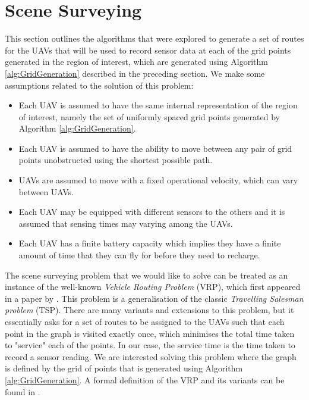 
\section{Scene Surveying}
This section outlines the algorithms that were explored to generate a set of routes for the UAVs that will be used to record sensor data at each of the grid points generated in the region of interest, which are generated using Algorithm \ref{alg:GridGeneration} described in the preceding section. We make some assumptions related to the solution of this problem:
\begin{itemize}
    \item Each UAV is assumed to have the same internal representation of the region of interest, namely the set of uniformly spaced grid points generated by Algorithm \ref{alg:GridGeneration}.
    \item Each UAV is assumed to have the ability to move between any pair of grid points unobstructed using the shortest possible path.
    \item UAVs are assumed to move with a fixed operational velocity, which can vary between UAVs.
    \item Each UAV may be equipped with different sensors to the others and it is assumed that sensing times may varying among the UAVs.
    \item Each UAV has a finite battery capacity which implies they have a finite amount of time that they can fly for before they need to recharge.
\end{itemize}


The scene surveying problem that we would like to solve can be treated as an instance of the well-known \textit{Vehicle Routing Problem} (VRP), which first appeared in a paper by \citeauthor{Dantzig1959TheProblem} \cite{Dantzig1959TheProblem}. This problem is a generalisation of the classic \textit{Travelling Salesman problem} (TSP). There are many variants and extensions to this problem, but it essentially asks for a set of routes to be assigned to the UAVs such that each point in the graph is visited exactly once, which minimises the total time taken to "service" each of the points. In our case, the service time is the time taken to record a sensor reading. We are interested solving this problem where the graph is defined by the grid of points that is generated using Algorithm \ref{alg:GridGeneration}. A formal definition of the VRP and its variants can be found in \cite{Toth2002TheProblem}.

